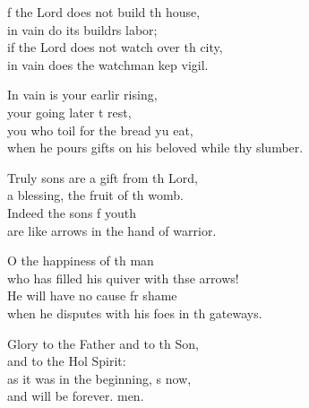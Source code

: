 \settowidth{\versewidth}{when he pours gifts on his beloved while they slumber.}
\begin{psalmverse}%
  \begin{patverse}
f the Lord does not build th house,\Med\\
in vain do its buildrs labor;\\
if the Lord does not watch over th city,\Med\\
in vain does the watchman kep vigil.

In vain is your earlir rising,\Med\\
your going later t rest,\\
you who toil for the bread yu eat,\Med\\
when he pours gifts on his beloved while thy slumber.

Truly sons are a gift from th Lord,\Med\\
a blessing, the fruit of th womb.\\
Indeed the sons f youth\Med\\
are like arrows in the hand of  warrior.

O the happiness of th man\Med\\
who has filled his quiver with thse arrows!\\
He will have no cause fr shame\Med\\
when he disputes with his foes in th gateways.

Glory to the Father and to th Son,\Med\\
and to the Hol Spirit:\\
as it was in the beginning, \pointup{\i}s now,\Med\\
and will be forever. men. 
  \end{patverse}
\end{psalmverse}
